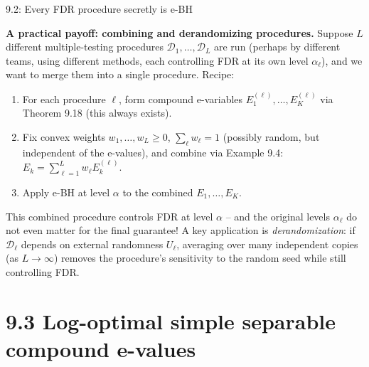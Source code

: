 \documentclass[aspectratio=169,10pt]{beamer}
\begin{document}
\begin{frame}[allowframebreaks]{9.2: Every FDR procedure secretly is e-BH}
\framebreak

\textbf{A practical payoff: combining and derandomizing procedures.} Suppose $L$ different multiple-testing procedures $\mathcal{D}_1,\dots,\mathcal{D}_L$ are run (perhaps by different teams, using different methods, each controlling FDR at its own level $\alpha_\ell$), and we want to merge them into a single procedure. Recipe:

\begin{enumerate}
\item For each procedure $\ell$, form compound e-variables $E_1^{(\ell)},\dots,E_K^{(\ell)}$ via Theorem 9.18 (this always exists).
\item Fix convex weights $w_1,\dots,w_L\ge0$, $\sum_\ell w_\ell=1$ (possibly random, but independent of the e-values), and combine via Example 9.4: $E_k = \sum_{\ell=1}^L w_\ell E_k^{(\ell)}$.
\item Apply e-BH at level $\alpha$ to the combined $E_1,\dots,E_K$.
\end{enumerate}
This combined procedure controls FDR at level $\alpha$ -- and the original levels $\alpha_\ell$ do not even matter for the final guarantee! A key application is \emph{derandomization}: if $\mathcal{D}_\ell$ depends on external randomness $U_\ell$, averaging over many independent copies (as $L\to\infty$) removes the procedure's sensitivity to the random seed while still controlling FDR.

\end{frame}

\section{9.3 Log-optimal simple separable compound e-values}
\end{document}
